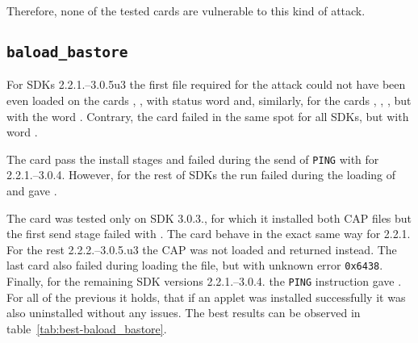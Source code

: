 
            Therefore, none of the tested cards are vulnerable to this kind of attack.

            \subsection{\texttt{baload_bastore}}

            For SDKs 2.2.1.--3.0.5u3 the first file \vulnscap required for the attack could not have been even loaded on the cards \Fcard, \Gcard, \Hcard with status word \shortswconditionsnotsatisfied and, similarly, for the cards \Ccard, \Icard, \Inewcard, but with the word \shortswwrongdata. Contrary, the card \Cnewcard failed in the same spot for all SDKs, but with word \shortswunknown.

            The card \Acard pass the install stages and failed during the send of \texttt{PING} with \shortswunknown for 2.2.1.--3.0.4. However, for the rest of SDKs the run failed during the loading of \appletscap and gave \shortswwrongdata.

            The card \Bcard was tested only on SDK 3.0.3., for which it installed both CAP files but the first send stage failed with \shortswunknown. The card \Dcard behave in the exact same way for 2.2.1. For the rest 2.2.2.--3.0.5.u3 the CAP \appletscap was not loaded and returned \shortswwrongdata instead. The last card \Jcard also failed during loading the \appletscap file, but with unknown error \texttt{0x6438}. Finally, for the remaining SDK versions 2.2.1.--3.0.4. the \texttt{PING} instruction gave \shortswunknown. For all of the previous it holds, that if an applet was installed successfully it was also uninstalled without any issues. The best results can be observed in table~\ref{tab:best-baload_bastore}.




